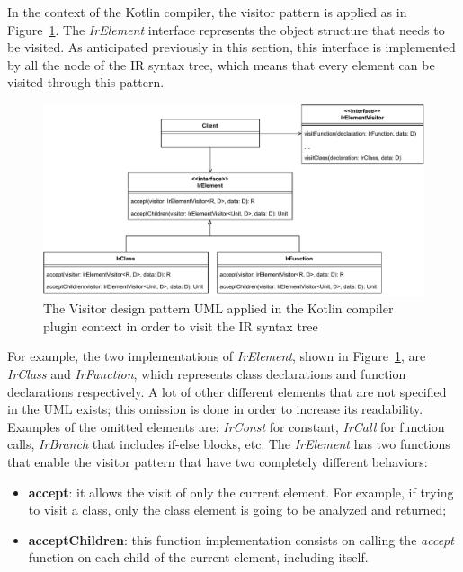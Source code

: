 In the context of the Kotlin compiler, the visitor pattern is applied as in Figure~\ref{fig:visitor_uml_kotlin_compiler}. The \textit{IrElement} interface represents the object structure that needs to be visited. As anticipated previously in this section, this interface is implemented by all the node of the IR syntax tree, which means that every element can be visited through this pattern.\newline
\begin{figure}[!ht]
    \centering
    \includegraphics[scale=0.77]{document/chapters/2-metaprogramming/images/visitor_uml_kotlin_compiler.pdf}
    \caption{The Visitor design pattern UML applied in the Kotlin compiler plugin context in order to visit the IR syntax tree}
    \label{fig:visitor_uml_kotlin_compiler}
\end{figure}
For example, the two implementations of \textit{IrElement}, shown in Figure~\ref{fig:visitor_uml_kotlin_compiler}, are \textit{IrClass} and \textit{IrFunction}, which represents class declarations and function declarations respectively. A lot of other different elements that are not specified in the UML exists; this omission is done in order to increase its readability. Examples of the omitted elements are: \textit{IrConst} for constant, \textit{IrCall} for function calls, \textit{IrBranch} that includes if-else blocks, etc.\newline
The \textit{IrElement} has two functions that enable the visitor pattern that have two completely different behaviors:
\begin{itemize}
    \item \textbf{accept}: it allows the visit of only the current element. For example, if trying to visit a class, only the class element is going to be analyzed and returned;
    \item \textbf{acceptChildren}: this function implementation consists on calling the \textit{accept} function on each child of the current element, including itself.
\end{itemize}
